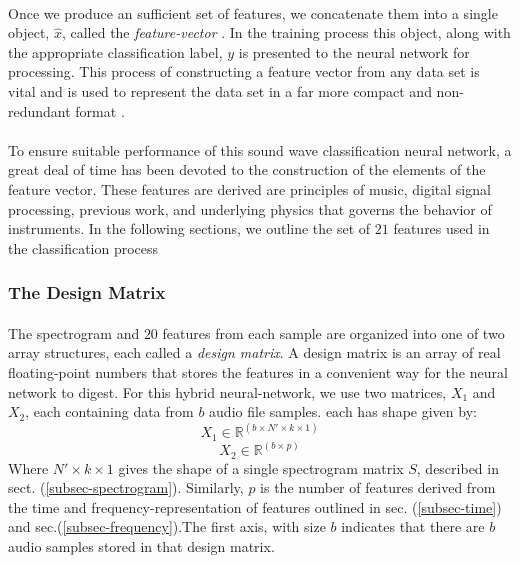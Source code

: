 \documentclass[12pt,letterpaper]{article}
\begin{document}
\paragraph*{}Once we produce an sufficient set of features, we concatenate them into a single object, $\hat{x}$, called the \textit{feature-vector} \cite{Goodfellow}. In the training process this object, along with the appropriate classification label, $y$ is presented to the neural network for processing. This process of constructing a feature vector from any data set is vital and is used to represent the data set in a far more compact and non-redundant format \cite{Virtanen,Liu,Kahn}.

\paragraph*{}To ensure suitable performance of this sound wave classification neural network, a great deal of time has been devoted to the construction of the elements of the feature vector. These features are derived are principles of music, digital signal processing, previous work, and underlying physics that governs the behavior of instruments. In the following sections, we outline the set of $21$ features used in the classification process

\newpage


\subsubsection{The Design Matrix}

\paragraph*{}The spectrogram and $20$ features from each sample are organized into one of two array structures, each called a \textit{design matrix}. A design matrix is an array of real floating-point numbers that stores the features in a convenient way for the neural network to digest. For this hybrid neural-network, we use two matrices, $X_1$ and $X_2$, each containing data from $b$ audio file samples. each has shape given by:
\begin{equation}
\label{eqn-X1Shape}
X_1 \in \mathbb{R}^{(b \times N' \times k \times 1)}
\end{equation}
\begin{equation}
\label{eqn-X2Shape}
X_2 \in \mathbb{R}^{(b \times p)}
\end{equation}
Where $N' \times k \times 1$ gives the shape of a single spectrogram matrix $S$, described in sect. (\ref{subsec-spectrogram}). Similarly, $p$ is the number of features derived from the time and frequency-representation of features outlined in sec. (\ref{subsec-time}) and sec.(\ref{subsec-frequency}).The first axis, with size $b$ indicates that there are $b$ audio samples stored in that design matrix.
\end{document}
